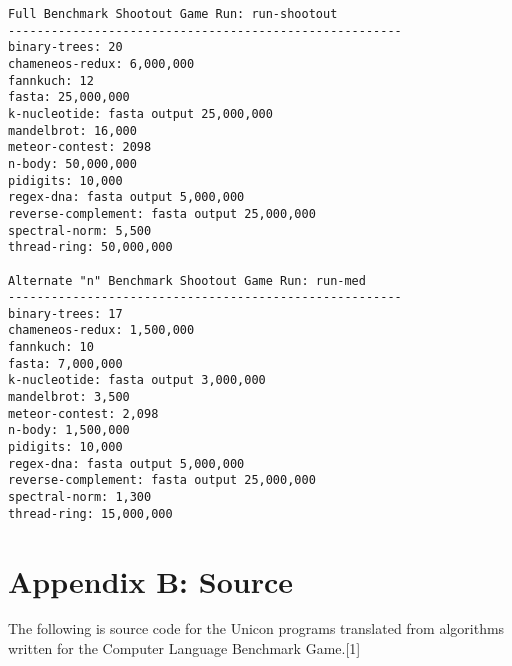 \documentclass[letterpaper,12pt]{article}
\begin{document}
\begin{adjustwidth}{-.5cm}{-.5cm}
\begin{verbatim}
Full Benchmark Shootout Game Run: run-shootout  
-------------------------------------------------------
binary-trees: 20    
chameneos-redux: 6,000,000    
fannkuch: 12    
fasta: 25,000,000    
k-nucleotide: fasta output 25,000,000    
mandelbrot: 16,000    
meteor-contest: 2098    
n-body: 50,000,000    
pidigits: 10,000    
regex-dna: fasta output 5,000,000    
reverse-complement: fasta output 25,000,000    
spectral-norm: 5,500    
thread-ring: 50,000,000    

Alternate "n" Benchmark Shootout Game Run: run-med
-------------------------------------------------------
binary-trees: 17  
chameneos-redux: 1,500,000  
fannkuch: 10    
fasta: 7,000,000    
k-nucleotide: fasta output 3,000,000     
mandelbrot: 3,500    
meteor-contest: 2,098     
n-body: 1,500,000    
pidigits: 10,000    
regex-dna: fasta output 5,000,000    
reverse-complement: fasta output 25,000,000    
spectral-norm: 1,300        
thread-ring: 15,000,000     

\end{verbatim}
\end{adjustwidth}
\section*{Appendix B: Source}

The following is source code for the Unicon programs translated 
from algorithms written for the Computer Language Benchmark Game.[1]


\newpage

\scriptsize
\end{document}
